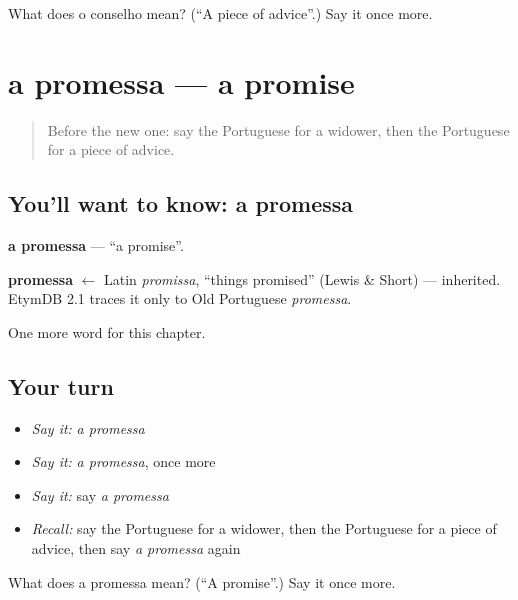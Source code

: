 \begin{tcolorbox}[breakable,colback=teal!4,colframe=teal!35!black,title={Before you move on}]
What does o conselho mean? (\textquotedblleft{}A piece of advice\textquotedblright{}.) Say it once more.
\end{tcolorbox}
\section[a promessa]{a promessa — a promise}

\label{lesson:PT-C222-promessa}



\begin{quote}
Before the new one: say the Portuguese for a widower, then the Portuguese for a piece of advice.
\end{quote}

\subsection*{You'll want to know: a promessa}
\textbf{a promessa} — \textquotedblleft{}a promise\textquotedblright{}.

\begin{cousinweb}
\textbf{promessa} $\leftarrow$ Latin \emph{promissa}, \textquotedblleft{}things promised\textquotedblright{} (Lewis \& Short) — inherited. EtymDB 2.1 traces it only to Old Portuguese \emph{promessa}.
\end{cousinweb}

\begin{grammarlens}[title={What you've built}]
One more word for this chapter.
\end{grammarlens}

\subsection*{Your turn}
\begin{itemize}
\raggedright
  \item \emph{Say it:} \emph{a promessa}
  \item \emph{Say it:} \emph{a promessa}, once more
  \item \emph{Say it:} say \emph{a promessa}
  \item \emph{Recall:} say the Portuguese for a widower, then the Portuguese for a piece of advice, then say \emph{a promessa} again
\end{itemize}

\begin{tcolorbox}[breakable,colback=teal!4,colframe=teal!35!black,title={Before you move on}]
What does a promessa mean? (\textquotedblleft{}A promise\textquotedblright{}.) Say it once more.
\end{tcolorbox}
